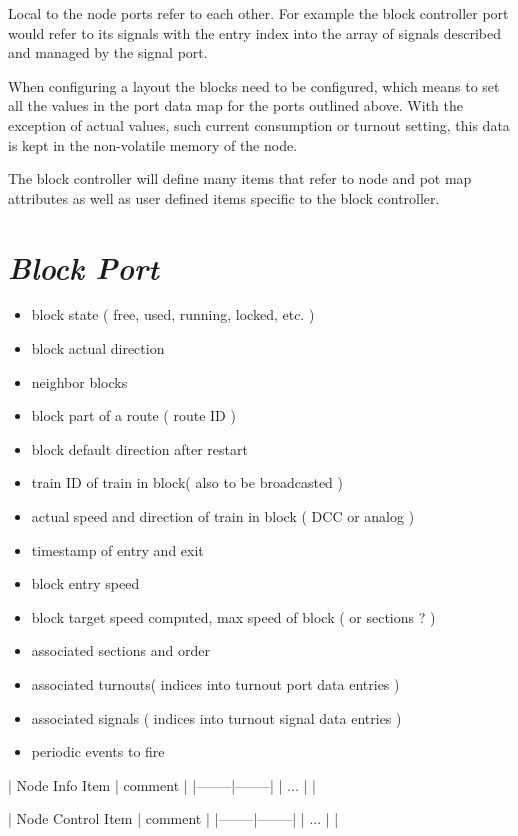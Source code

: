 Local to the node ports refer to each other. For example the block controller port would refer to its signals with the entry index into the array of signals described and managed by the signal port.

When configuring a layout the blocks need to be configured, which means to set all the values in the port data map for the ports outlined above. With the exception of actual values, such current consumption or turnout setting, this data is kept in the non-volatile memory of the node.

The block controller will define many items that refer to node and pot map attributes as well as user defined items specific to the block controller.

\section{\textit{Block Port}}
\begin{itemize}
\begin{itemize}
\item block state ( free, used, running, locked, etc. )
\item block actual direction
\item neighbor blocks
\item block part of a route ( route ID )
\item block default direction after restart
\item train ID of train in block( also to be broadcasted )
\item actual speed and direction of train in block ( DCC or analog )
\item timestamp of entry and exit
\item block entry speed
\item block target speed computed, max speed of block ( or sections ? )
\item associated sections and order
\item associated turnouts( indices into turnout port data entries )
\item associated signals ( indices into turnout signal data entries )
\item periodic events to fire
\end{itemize}
\end{itemize}

| Node Info Item | comment |
|--------|--------|
| ... | |

| Node Control Item | comment |
|--------|--------|
| ... | |

